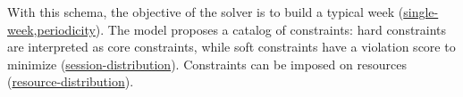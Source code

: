  With this schema, the objective of the solver is to build a typical week
 (\hyperref[feat:singleweek]{single-week},\hyperref[feat:periodicity]{periodicity}).
The model proposes a catalog of constraints: hard constraints are interpreted as core constraints, while soft constraints have a violation score to minimize 
(\hyperref[feat:sessiondistribution]{session-distribution}).
Constraints can be imposed on resources 
(\hyperref[feat:ressourcedistribution]{resource-distribution}).






